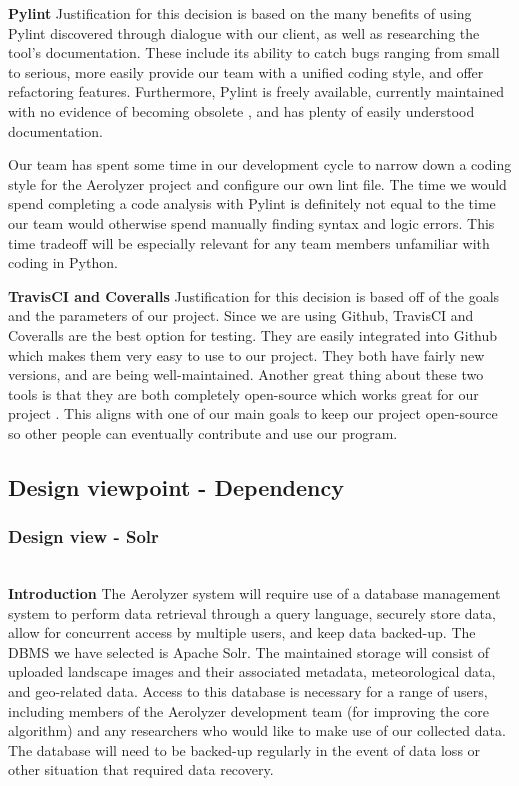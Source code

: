 \documentclass[onecolumn, draftclsnofoot,10pt, compsoc]{IEEEtran}
\begin{document}
\begin{flushleft}
\medskip

\textbf{Pylint } Justification for this decision is based on the many benefits of using Pylint discovered through dialogue with our client, as well as researching the tool's documentation. These include its ability to catch bugs ranging from small to serious, more easily provide our team with a unified coding style, and offer refactoring features. Furthermore, Pylint is freely available, currently maintained with no evidence of becoming obsolete \cite{20}, and has plenty of easily understood documentation. \cite{6} 

\medskip

Our team has spent some time in our development cycle to narrow down a coding style for the Aerolyzer project and configure our own lint file. The time we would spend completing a code analysis with Pylint is definitely not equal to the time our team would otherwise spend manually finding syntax and logic errors. This time tradeoff will be especially relevant for any team members unfamiliar with coding in Python.

\medskip

\textbf{TravisCI and Coveralls} Justification for this decision is based off of the goals and the parameters of our project. Since we are using Github, TravisCI and Coveralls are the best option for testing. They are easily integrated into Github which makes them very easy to use to our project. They both have fairly new versions, and are being well-maintained. Another great thing about these two tools is that they are both completely open-source which works great for our project \cite{15}. This aligns with one of our main goals to keep our project open-source so other people can eventually contribute and use our program.

\bigskip

\subsection{Design viewpoint - Dependency}
\subsubsection{Design view - Solr} \ \\
\textbf{Introduction} The Aerolyzer system will require use of a database management system to perform data retrieval through a query language, securely store data, allow for concurrent access by multiple users, and keep data backed-up. The DBMS we have selected is Apache Solr. The maintained storage will consist of uploaded landscape images and their associated metadata, meteorological data, and geo-related data. Access to this database is necessary for a range of users, including members of the Aerolyzer development team (for improving the core algorithm) and any researchers who would like to make use of our collected data. The database will need to be backed-up regularly in the event of data loss or other situation that required data recovery.


\end{flushleft}
\end{document}
